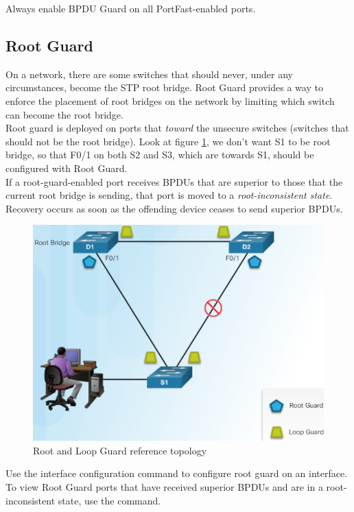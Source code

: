 \note Always enable BPDU Guard on all PortFast-enabled ports.

\subsection{Root Guard}

On a network, there are some switches that should never, under any circumstances, become the STP root bridge. Root Guard provides a way to enforce the placement of root bridges on the network by limiting which switch can become the root bridge. \\

Root guard is deployed on ports that \emph{toward} the unsecure switches (switches that should not be the root bridge). Look at figure \ref{RootLoopGuard}, we don't want S1 to be root bridge, so that F0/1 on both S2 and S3, which are towards S1, should be configured with Root Guard.\\
If a root-guard-enabled port receives BPDUs that are superior to those that the current root bridge is sending, that port is moved to a \emph{root-inconsistent state}. Recovery occurs as soon as the offending device ceases to send superior BPDUs.\\

\begin{figure}[hbtp]
\caption{Root and Loop Guard reference topology}\label{RootLoopGuard}
\centering
\includegraphics[scale=0.5]{pictures/RootLoopGuard.PNG}
\end{figure}


Use the  interface configuration command to configure root guard on an interface. To view Root Guard ports that have received superior BPDUs and are in a root-inconsistent state, use the  command.

